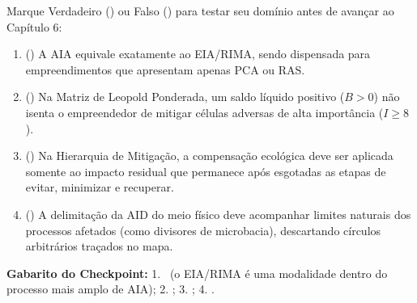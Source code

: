 \begin{boxTeste}
  Marque Verdadeiro (\V) ou Falso (\F) para testar seu domínio antes de avançar ao Capítulo 6:
  \begin{enumerate}[leftmargin=1.8em, itemsep=3pt]
    \item (\quad) A AIA equivale exatamente ao EIA/RIMA, sendo dispensada para empreendimentos que apresentam apenas PCA ou RAS.
    \item (\quad) Na Matriz de Leopold Ponderada, um saldo líquido positivo ($B > 0$) não isenta o empreendedor de mitigar células adversas de alta importância ($I \ge 8$).
    \item (\quad) Na Hierarquia de Mitigação, a compensação ecológica deve ser aplicada somente ao impacto residual que permanece após esgotadas as etapas de evitar, minimizar e recuperar.
    \item (\quad) A delimitação da AID do meio físico deve acompanhar limites naturais dos processos afetados (como divisores de microbacia), descartando círculos arbitrários traçados no mapa.
  \end{enumerate}
  \vspace{4pt}
  {\footnotesize\textbf{Gabarito do Checkpoint:} 1. \F\ (o EIA/RIMA é uma modalidade dentro do processo mais amplo de AIA); 2. \V; 3. \V; 4. \V.}
\end{boxTeste}
